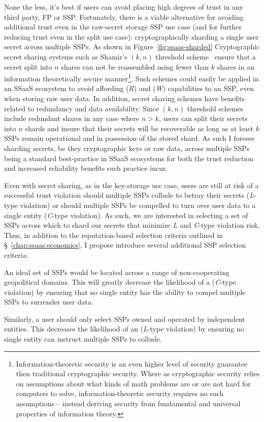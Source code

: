None the less, it's best if users can avoid placing high degrees of
trust in any third party, FP or SSP. Fortunately, there is a viable
alternative for avoiding additional trust even in the raw-secret
storage SSP use case (and for further reducing trust even in the split
use case): cryptographically sharding a single user secret across
multiple SSPs. As shown in Figure~\ref{fig:ssaas-sharded}
Cryptographic secret sharing systems such as Shamir's $(k, n)$
threshold scheme~\cite{shamir1979} ensure that a secret split into $n$
shares can not be reassembled using fewer than $k$ shares in an
information theoretically secure manner\footnote{Information-theoretic
  security is an even higher level of security guarantee then
  traditional cryptographic security. Where as cryptographic security
  relies on assumptions about what kinds of math problems are or are
  not hard for computers to solve, information-theoretic security
  requires no such assumptions -- instead deriving security from
  fundamental and universal properties of information theory.}. Such
schemes could easily be applied in an SSaaS ecosystem to avoid
affording (\emph{R}) and (\emph{W}) capabilities to an SSP, even when
storing raw user data. In addition, secret sharing schemes have
benefits related to redundancy and data availability. Since $(k, n)$
threshold schemes include redundant shares in any case where $n > k$,
users can split their secrets into $n$ shards and insure that their
secrets will be recoverable as long as at least $k$ SSPs remain
operational and in possession of the stored shard. As such I foresee
sharding secrets, be they cryptographic keys or raw data, across
multiple SSPs being a standard best-practice in SSaaS ecosystems for
both the trust reduction and increased reliability benefits such
practice incur.

Even with secret sharing, as in the key-storage use case, users are
still at risk of a successful trust violation should multiple SSPs
collude to betray their secrets (\emph{L}-type violation) or should
multiple SSPs be compelled to turn over user data to a single entity
(\emph{C}-type violation). As such, we are interested in selecting a
set of SSPs across which to shard our secrets that minimize \emph{L}
and \emph{C}-type violation risk. Thus, in addition to the
reputation-based selection criteria outlined in
\S~\ref{chap:ssaas:economics}, I propose introduce several additional
SSP selection criteria:

\begin{packed_desc}
\item[Geopolitical Diversity] An ideal set of SSPs would be located
  across a range of non-cooperating geopolitical domains. This will
  greatly decrease the likelihood of a (\emph{C}-type violation) by
  ensuring that no single entity has the ability to compel multiple
  SSPs to surrender user data.
\item[Ownership Diversity] Similarly, a user should only select SSPs
  owned and operated by independent entities. This decreases the
  likelihood of an (\emph{L}-type violation) by ensuring no single
  entity can instruct multiple SSPs to collude.
\end{packed_desc}

